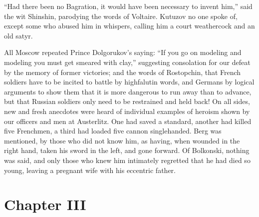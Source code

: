 ``Had there been no Bagration, it would have been necessary to
invent him,'' said the wit Shinshin, parodying the words of
Voltaire. Kutuzov no one spoke of, except some who abused him in
whispers, calling him a court weathercock and an old satyr.

All Moscow repeated Prince Dolgorukov's saying: ``If you go on
modeling and modeling you must get smeared with clay,''
suggesting consolation for our defeat by the memory of former
victories; and the words of Rostopchin, that French soldiers have
to be incited to battle by highfalutin words, and Germans by
logical arguments to show them that it is more dangerous to run
away than to advance, but that Russian soldiers only need to be
restrained and held back! On all sides, new and fresh anecdotes
were heard of individual examples of heroism shown by our
officers and men at Austerlitz. One had saved a standard, another
had killed five Frenchmen, a third had loaded five cannon
singlehanded. Berg was mentioned, by those who did not know him,
as having, when wounded in the right hand, taken his sword in the
left, and gone forward. Of Bolkonski, nothing was said, and only
those who knew him intimately regretted that he had died so
young, leaving a pregnant wife with his eccentric father.


\chapter*{Chapter III}
\ifaudio     
{} 
\fi

